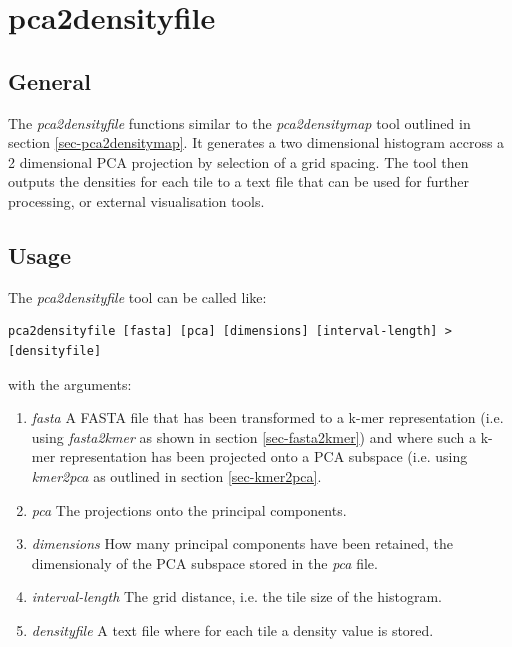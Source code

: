 \section{pca2densityfile} \label{sec-pca2densityfile}

\subsection{General}

The \emph{pca2densityfile} functions similar to the
\emph{pca2densitymap} tool outlined in section
\ref{sec-pca2densitymap}. It generates a two dimensional histogram
accross a 2 dimensional PCA projection by selection of a grid
spacing. The tool then outputs the densities for each tile to a text
file that can be used for further processing, or external
visualisation tools.

\subsection{Usage}

The \emph{pca2densityfile} tool can be called like:
\begin{lstlisting}
pca2densityfile [fasta] [pca] [dimensions] [interval-length] > [densityfile]
\end{lstlisting}
with the arguments:
\begin{enumerate}
  \item \emph{fasta} A FASTA file that has been transformed to a k-mer
    representation (i.e. using \emph{fasta2kmer} as shown in section
    \ref{sec-fasta2kmer}) and where such a k-mer representation has been
    projected onto a PCA subspace (i.e. using \emph{kmer2pca} as
    outlined in section \ref{sec-kmer2pca}.
  \item \emph{pca} The projections onto the principal components.
  \item \emph{dimensions} How many principal components have been
    retained, the dimensionaly of the PCA subspace stored in the
    \emph{pca} file.
  \item \emph{interval-length} The grid distance, i.e. the tile size
    of the histogram.
  \item \emph{densityfile} A text file where for each tile a density
    value is stored.
\end{enumerate}

